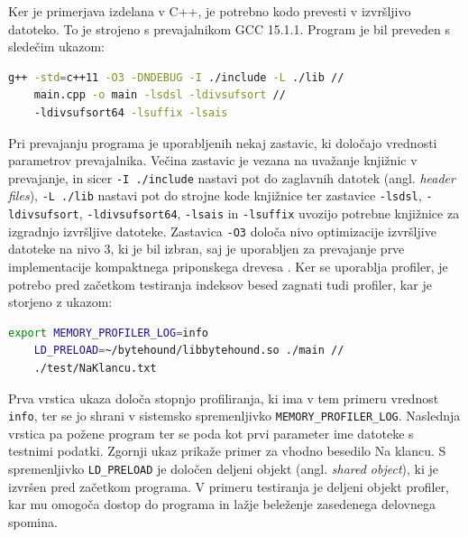 Ker je primerjava izdelana v C++, je potrebno kodo prevesti v izvršljivo datoteko. To je strojeno s prevajalnikom GCC 15.1.1. Program je bil preveden s sledečim ukazom:
\begin{lstlisting}[language=bash]
    g++ -std=c++11 -O3 -DNDEBUG -I ./include -L ./lib // 
    main.cpp -o main -lsdsl -ldivsufsort //
    -ldivsufsort64 -lsuffix -lsais
\end{lstlisting}
Pri prevajanju programa je uporabljenih nekaj zastavic, ki določajo vrednosti parametrov prevajalnika. Večina zastavic je vezana na uvažanje knjižnic v prevajanje, in sicer \verb|-I ./include| nastavi pot do zaglavnih datotek (angl. \textit{header files}), \verb|-L ./lib| nastavi pot do strojne kode knjižnice ter zastavice \verb|-lsdsl|, \verb|-ldivsufsort|, \verb|-ldivsufsort64|,  \verb|-lsais| in \verb|-lsuffix| uvozijo potrebne knjižnice za izgradnjo izvršljive datoteke.
Zastavica \verb|-O3| določa nivo optimizacije izvršljive datoteke na nivo 3, ki je bil izbran, saj je uporabljen za prevajanje prve implementacije kompaktnega priponskega drevesa \cite{Valimaki2007}. Ker se uporablja profiler, je potrebo pred začetkom testiranja indeksov besed zagnati tudi profiler, kar je storjeno z ukazom:
\begin{lstlisting}[language=bash]
    export MEMORY_PROFILER_LOG=info
    LD_PRELOAD=~/bytehound/libbytehound.so ./main // 
    ./test/NaKlancu.txt 
\end{lstlisting}
Prva vrstica ukaza določa stopnjo profiliranja, ki ima v tem primeru vrednost \verb|info|, ter se jo shrani v sistemsko spremenljivko \verb|MEMORY_PROFILER_LOG|. Naslednja vrstica pa požene program ter se poda kot prvi parameter ime datoteke s testnimi podatki. Zgornji ukaz prikaže primer za vhodno besedilo Na klancu. S spremenljivko \verb|LD_PRELOAD| je določen deljeni objekt (angl. \textit{shared object}), ki je izvršen pred začetkom programa. V primeru testiranja je deljeni objekt profiler, kar mu omogoča dostop do programa in lažje beleženje zasedenega delovnega spomina.

